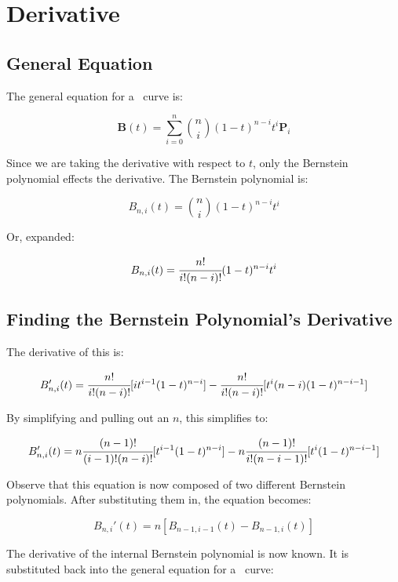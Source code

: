 \documentclass[oneside]{article}
\begin{document}
\maketitle
\tableofcontents
\setcounter{tocdepth}{2}

\newpage

\section{Derivative}
\label{Derivative}

\subsection{General Equation}
The general equation for a \Bezier\ curve is:

\begin{equation}\label{bezier_general}
	\mathbf{B}(t) = \sum_{i=0}^n {n\choose i} (1 - t)^{n - i} t^i \mathbf{P}_i
\end{equation}

Since we are taking the derivative with respect to $t$, only the Bernstein polynomial effects the derivative.  The Bernstein polynomial is:

\[ B_{n,i}(t) = {n\choose i} (1 - t)^{n - i} t^i \]

Or, expanded:

\[ B_{n,i}(t) = \cfrac{n!}{i! (n - i)!} (1 - t)^{n - i} t^i \]

\subsection{Finding the Bernstein Polynomial's Derivative}

The derivative of this is:

\[ B_{n,i}'(t) = \cfrac{n!}{i! (n - i)!} [ it^{i - 1} (1 - t)^{n - i}] - \cfrac{n!}{i! (n - i)!}[t^i (n - i)(1 - t)^{n - i - 1}] \]

By simplifying and pulling out an $n$, this simplifies to:

\[ B_{n,i}'(t) = n \cfrac{(n - 1)!}{(i - 1)! (n - i)!} [ t^{i - 1} (1 - t)^{n - i}] - n \cfrac{(n - 1)!}{i! (n - i - 1)!}[t^i (1 - t)^{n - i - 1}] \]

Observe that this equation is now composed of two different Bernstein polynomials.  After substituting them in, the equation becomes:

\[ B_{n,i}'(t) = n [ B_{n-1,i-1}(t) - B_{n-1,i}(t) ] \]

The derivative of the internal Bernstein polynomial is now known.  It is substituted back into the general equation for a \Bezier\ curve:
\end{document}
